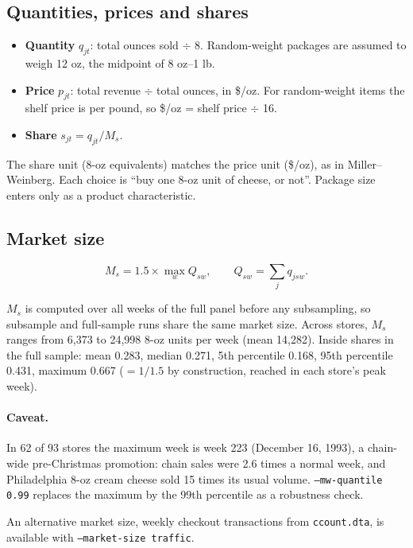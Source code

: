 \documentclass[11pt]{article}
\newcommand{\code}[1]{\texttt{#1}}
\begin{document}
\subsection{Quantities, prices and shares}\label{sec:shares}

\begin{itemize}
  \item \textbf{Quantity} $q_{jt}$: total ounces sold $\div$ 8. Random-weight packages are
        assumed to weigh 12 oz, the midpoint of 8 oz--1 lb.
  \item \textbf{Price} $p_{jt}$: total revenue $\div$ total ounces, in \$/oz. For random-weight
        items the shelf price is per pound, so \$/oz = shelf price $\div$ 16.
  \item \textbf{Share} $s_{jt} = q_{jt} / M_s$.
\end{itemize}

The share unit (8-oz equivalents) matches the price unit (\$/oz), as in Miller--Weinberg. Each
choice is ``buy one 8-oz unit of cheese, or not''. Package size enters only as a product
characteristic.

\subsection{Market size}\label{sec:marketsize}

\begin{equation}
  M_s = 1.5 \times \max_w Q_{sw}, \qquad Q_{sw} = \sum_{j} q_{jsw}.
\end{equation}

$M_s$ is computed over all weeks of the full panel before any subsampling, so subsample and
full-sample runs share the same market size. Across stores, $M_s$ ranges from 6,373 to 24,998
8-oz units per week (mean 14,282). Inside shares in the full sample: mean 0.283, median 0.271,
5th percentile 0.168, 95th percentile 0.431, maximum 0.667 ($=1/1.5$ by construction, reached
in each store's peak week).

\paragraph{Caveat.} In 62 of 93 stores the maximum week is week 223 (December 16, 1993), a
chain-wide pre-Christmas promotion: chain sales were 2.6 times a normal week, and Philadelphia
8-oz cream cheese sold 15 times its usual volume. \code{--mw-quantile 0.99} replaces the
maximum by the 99th percentile as a robustness check.

An alternative market size, weekly checkout transactions from \code{ccount.dta}, is available
with \code{--market-size traffic}.
\end{document}
